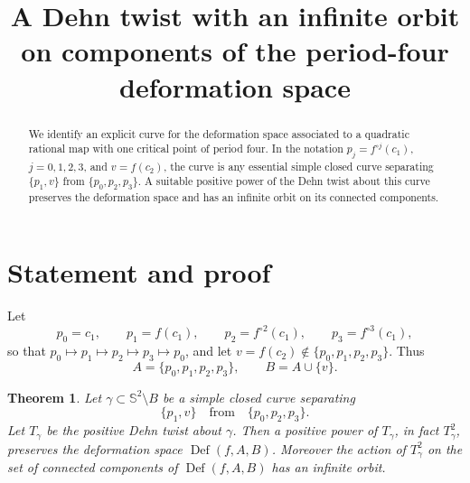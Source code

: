 \documentclass[11pt]{amsart}
\newcommand{\Sph}{\mathbb S}
\newcommand{\Def}{\operatorname{Def}}
\theoremstyle{plain}
\newtheorem{theorem}{Theorem}
\theoremstyle{remark}
\begin{document}
\title{A Dehn twist with an infinite orbit on components of the period-four deformation space}
\author{}
\date{}
\maketitle

\begin{abstract}
We identify an explicit curve for the deformation space associated to a quadratic
rational map with one critical point of period four.  In the notation
\(p_j=f^{\circ j}(c_1)\), \(j=0,1,2,3\), and \(v=f(c_2)\), the curve is any
essential simple closed curve separating \(\{p_1,v\}\) from
\(\{p_0,p_2,p_3\}\).  A suitable positive power of the Dehn twist about this
curve preserves the deformation space and has an infinite orbit on its connected
components.
\end{abstract}

\section*{Statement and proof}

Let
\[
p_0=c_1,\qquad p_1=f(c_1),\qquad p_2=f^{\circ 2}(c_1),\qquad
p_3=f^{\circ 3}(c_1),
\]
so that \(p_0\mapsto p_1\mapsto p_2\mapsto p_3\mapsto p_0\), and let
\(v=f(c_2)\notin \{p_0,p_1,p_2,p_3\}\).  Thus
\[
A=\{p_0,p_1,p_2,p_3\},\qquad B=A\cup\{v\}.
\]

\begin{theorem}
Let \(\gamma\subset \Sph^2\setminus B\) be a simple closed curve separating
\[
\{p_1,v\}\quad\text{from}\quad \{p_0,p_2,p_3\}.
\]
Let \(T_\gamma\) be the positive Dehn twist about \(\gamma\).  Then a positive
power of \(T_\gamma\), in fact \(T_\gamma^2\), preserves the deformation space
\(\Def(f,A,B)\).  Moreover the action of \(T_\gamma^2\) on the set of connected
components of \(\Def(f,A,B)\) has an infinite orbit.
\end{theorem}
\end{document}
